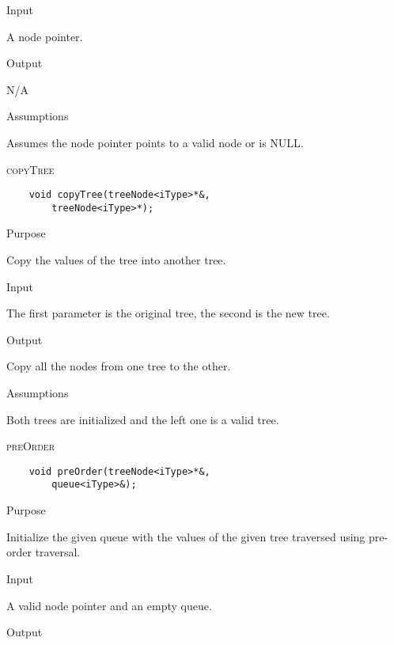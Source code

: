 \documentclass[pdftex, 12pt]{article}
\begin{document}
\begin{description}
\begin{description}
			\item{Input}

				A node pointer.

			\item{Output}

				N/A

			\item{Assumptions}

				Assumes the node pointer points to a valid node or is NULL.

		\end{description}
	\item{\textsc{copyTree}}
\begin{lstlisting}
	void copyTree(treeNode<iType>*&,
		treeNode<iType>*);
\end{lstlisting}
		\begin{description}

			\item{Purpose}

				Copy the values of the tree into another tree.

			\item{Input}

				The first parameter is the original tree, the second is the new tree.

			\item{Output}

				Copy all the nodes from one tree to the other.

			\item{Assumptions}

				Both trees are initialized and the left one is a valid tree.

		\end{description}
	\item{\textsc{preOrder}}
\begin{lstlisting}
	void preOrder(treeNode<iType>*&,
		queue<iType>&);
\end{lstlisting}
		\begin{description}

			\item{Purpose}
				
				Initialize the given queue with the values of the given tree traversed using pre-order traversal.

			\item{Input}

				A valid node pointer and an empty queue.

			\item{Output}


\end{description}
\end{description}
\end{document}
